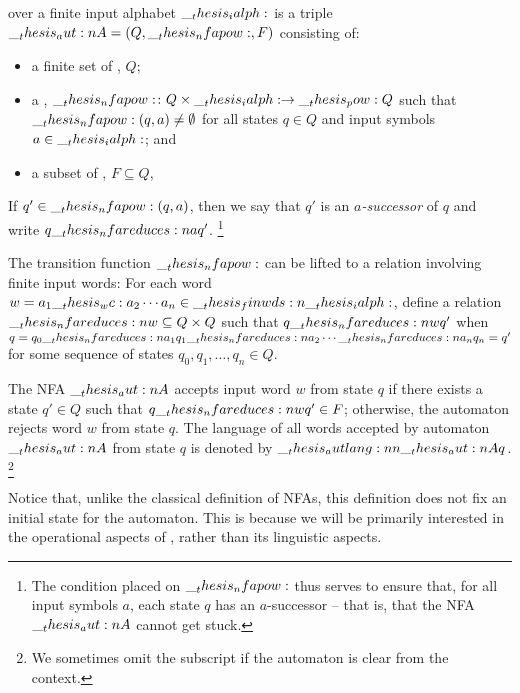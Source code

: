 \begin{definition}\label{def:finite-automata:nfa}
   over a finite input alphabet $\__thesis_ialph:$ is a triple $\__thesis_aut:n {A} = (Q, \__thesis_nfapow:, F)$ consisting of:
  \begin{itemize}
  \item a finite set of , $Q$;
  \item a , $\__thesis_nfapow:\colon Q \times \__thesis_ialph: \to \__thesis_pow: {Q}$ such that $\__thesis_nfapow:(q, a) \neq \emptyset$ for all states $q \in Q$ and input symbols $a \in \__thesis_ialph:$; and
  \item a subset of , $F \subseteq Q$,
  \end{itemize}
  If $q' \in \__thesis_nfapow:(q, a)$, then we say that $q'$ is an \emph{$a$-successor} of $q$ and write $q \nfareduces[a] q'$.%
  \footnote{The condition placed on $\__thesis_nfapow:$ thus serves to ensure that, for all input symbols $a$, each state $q$ has an $a$-successor -- that is, that the \ac{NFA} $\__thesis_aut:n {A}$ cannot get stuck.}

  The transition function $\__thesis_nfapow:$ can be lifted to a relation involving finite input words: For each word $w = a_1 \wc a_2 \dotsm a_n \in \finwds{\ialph}$, define a relation $\mathord{\nfareduces[\smash{w}]} \subseteq Q \times Q$ such that $q \nfareduces[w] q'$ when $q = q_0 \nfareduces[a_1] q_1 \nfareduces[a_2] \dotsb \nfareduces[a_n] q_n = q'$ for some sequence of states $q_0, q_1, \dotsc, q_n \in Q$.

  The \ac{NFA} $\__thesis_aut:n {A}$ accepts input word $w$ from state $q$ if there exists a state $q' \in Q$ such that $q \nfareduces[w] q' \in F$;
  otherwise, the automaton rejects word $w$ from state $q$.
  The language of all words accepted by automaton $\__thesis_aut:n {A}$ from state $q$ is denoted by $\__thesis_autlang:nn {\__thesis_aut:n {A}} {q}$.%
  \footnote{We sometimes omit the subscript if the automaton is clear from the context.}
\end{definition}

Notice that, unlike the classical definition of \acp{NFA}, this definition does not fix an initial state for the automaton.
This is because we will be primarily interested in the operational aspects of , rather than its linguistic aspects.

